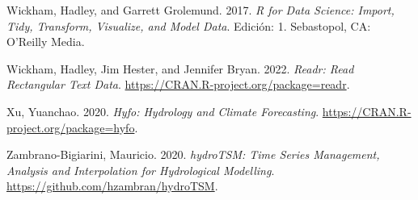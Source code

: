\begin{CSLReferences}{1}{0}
\leavevmode{}%
Wickham, Hadley, and Garrett Grolemund. 2017. \emph{R for {Data} {Science}: {Import}, {Tidy}, {Transform}, {Visualize}, and {Model} {Data}}. Edición: 1. Sebastopol, CA: O'Reilly Media.

\leavevmode{}%
Wickham, Hadley, Jim Hester, and Jennifer Bryan. 2022. \emph{Readr: Read Rectangular Text Data}. \url{https://CRAN.R-project.org/package=readr}.

\leavevmode{}%
Xu, Yuanchao. 2020. \emph{Hyfo: Hydrology and Climate Forecasting}. \url{https://CRAN.R-project.org/package=hyfo}.

\leavevmode{}%
Zambrano-Bigiarini, Mauricio. 2020. \emph{hydroTSM: Time Series Management, Analysis and Interpolation for Hydrological Modelling}. \url{https://github.com/hzambran/hydroTSM}.

\end{CSLReferences}


\address{%
Ezequiel Toum\\
IANIGLA-CONICET\\%
Av. Ruiz Leal s/n Parque General San Martin - Mendoza\\ Argentina\\
%
%
\textit{ORCiD: \href{https://orcid.org/0000-0002-4482-0559}{0000-0002-4482-0559}}\\%
\href{mailto:etoum@mendoza-conicet.gob.ar}{\nolinkurl{etoum@mendoza-conicet.gob.ar}}%
}

\address{%
Pierre Pitte\\
IANIGLA-CONICET\\%
Av. Ruiz Leal s/n Parque General San Martin - Mendoza\\ Argentina\\
%
%
\textit{ORCiD: \href{https://orcid.org/0000-0001-5625-8287}{0000-0001-5625-8287}}\\%
\href{mailto:pierrepitte@mendoza-conicet.gob.ar}{\nolinkurl{pierrepitte@mendoza-conicet.gob.ar}}%
}
